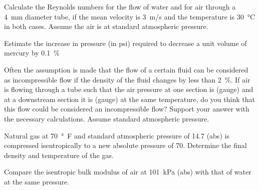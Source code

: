 \begin{question}
  Calculate the Reynolds numbers for the flow of water and for air
  through a \SI{4}{\mm} diameter tube, if the mean velocity is
  \SI{3}{\m/\s} and the temperature is \SI{30}{\celsius} in both
  cases. Assume the air is at standard atmospheric pressure.
\end{question}

\begin{question}
Estimate the increase in pressure (in psi) required to decrease a unit
volume of mercury by \SI{0.1}{\percent}
\end{question}

\begin{question}
Often the assumption is made that the flow of a certain fluid can be
considered as incompressible flow if the density of the fluid changes
by less than \SI{2}{\percent}. If air is flowing through a tube such
that the air pressure at one section is  (gauge) and at a
downstream section it is  (gauge) at the same
temperature, do you think that this flow could be considered an
incompressible flow? Support your answer with the necessary
calculations. Assume standard atmospheric pressure.
\end{question}

\begin{question}
  Natural gas at \SI{70}{\degree{F}} and standard atmospheric pressure
  of \SI{14.7}{\psi} (abs) is compressed isentropically to a new
  absolute pressure of \SI{70}{\psi}. Determine the final density and
  temperature of the gas.
\end{question}

\begin{question}
  Compare the isentropic bulk modulus of air at \SI{101}{\kPa} (abs)
  with that of water at the same pressure.
\end{question}
